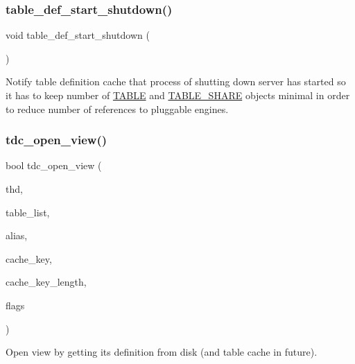 \subsubsection{\texorpdfstring{table\+\_\+def\+\_\+start\+\_\+shutdown()}{table\_def\_start\_shutdown()}}
{\footnotesize\ttfamily void table\+\_\+def\+\_\+start\+\_\+shutdown (\begin{DoxyParamCaption}\item[{void}]{ }\end{DoxyParamCaption})}

Notify table definition cache that process of shutting down server has started so it has to keep number of \mbox{\hyperlink{structTABLE}{T\+A\+B\+LE}} and \mbox{\hyperlink{structTABLE__SHARE}{T\+A\+B\+L\+E\+\_\+\+S\+H\+A\+RE}} objects minimal in order to reduce number of references to pluggable engines. \mbox{\label{group__Data__Dictionary_ga917237a2e99cef2eb34e64095d79fb1a}} 
\subsubsection{\texorpdfstring{tdc\+\_\+open\+\_\+view()}{tdc\_open\_view()}}
{\footnotesize\ttfamily bool tdc\+\_\+open\+\_\+view (\begin{DoxyParamCaption}\item[{T\+HD $\ast$}]{thd,  }\item[{\mbox{\hyperlink{structTABLE__LIST}{T\+A\+B\+L\+E\+\_\+\+L\+I\+ST}} $\ast$}]{table\+\_\+list,  }\item[{const char $\ast$}]{alias,  }\item[{const char $\ast$}]{cache\+\_\+key,  }\item[{size\+\_\+t}]{cache\+\_\+key\+\_\+length,  }\item[{uint}]{flags }\end{DoxyParamCaption})}

Open view by getting its definition from disk (and table cache in future).


